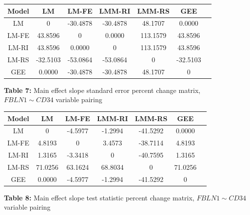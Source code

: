 \documentclass[12pt,]{article}
\begin{document}
\vspace{20pt}

\begin{center}
\begin{tabular}{|c||c|c|c|c|c|c|}
\hline
Model & LM & LM-FE & LMM-RI & LMM-RS & GEE \\
\hline
\hline
LM & 0   & -30.4878 & -30.4878  & \cellcolor{red!25} 48.1707   & \cellcolor{green!25}0.0000  \\
\hline
LM-FE & 43.8596  & 0   &  \cellcolor{orange!25} 0.0000    & \cellcolor{red!25} 113.1579  & 43.8596  \\
\hline
LM-RI & 43.8596  &  \cellcolor{orange!25} 0.0000   & 0    & \cellcolor{red!25} 113.1579  & 43.8596  \\
\hline
LM-RS & \cellcolor{blue!25} -32.5103 & \cellcolor{blue!25} -53.0864 & \cellcolor{blue!25} -53.0864  & 0    & \cellcolor{blue!25} -32.5103  \\
\hline
GEE & \cellcolor{green!25}  0.0000   & -30.4878 & -30.4878  & \cellcolor{red!25} 48.1707   & 0  \\
\hline
\end{tabular}

\vspace{5pt}

\textbf{Table 7:} Main effect slope standard error percent change matrix, $FBLN1 \sim CD34$ variable pairing
\end{center}

\vspace{20pt}

\begin{center}
\begin{tabular}{|c||c|c|c|c|c|c|}
\hline
Model & LM & LM-FE & LMM-RI & LMM-RS & GEE \\
\hline
\hline
LM & 0  & -4.5977  & -1.2994   & \cellcolor{red!25} -41.5292  & \cellcolor{green!25} 0.0000  \\
\hline
LM-FE & 4.8193  & 0   &  \cellcolor{orange!25} 3.4573    & \cellcolor{red!25} -38.7114  & 4.8193  \\
\hline
LM-RI & 1.3165  &  \cellcolor{orange!25} -3.3418  & 0    & \cellcolor{red!25} -40.7595  & 1.3165  \\
\hline
LM-RS & \cellcolor{blue!25} 71.0256 & \cellcolor{blue!25} 63.1624  & \cellcolor{blue!25} 68.8034   & 0    & \cellcolor{blue!25} 71.0256  \\
\hline
GEE & \cellcolor{green!25} 0.0000  & -4.5977  & -1.2994   & \cellcolor{red!25} -41.5292  & 0  \\
\hline
\end{tabular}

\vspace{5pt}

\textbf{Table 8:} Main effect slope test statistic percent change matrix, $FBLN1 \sim CD34$ variable pairing
\end{center}
\end{document}
